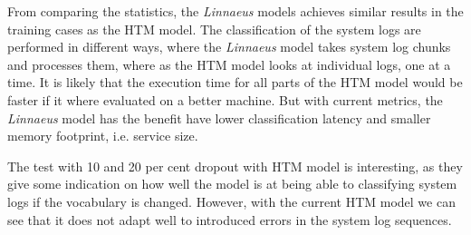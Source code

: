 From comparing the statistics, the \textit{Linnaeus} models achieves similar results in the training cases as the HTM model. The classification of the system logs are performed in different ways, where the \textit{Linnaeus} model takes system log chunks and processes them, where as the HTM model looks at individual logs, one at a time. It is likely that the execution time for all parts of the HTM model would be faster if it where evaluated on a better machine. But with current metrics, the \textit{Linnaeus} model has the benefit have lower classification latency and smaller memory footprint, i.e. service size.

The test with 10 and 20 per cent dropout with HTM model is interesting, as they give some indication on how well the model is at being able to classifying system logs if the vocabulary is changed. However, with the current HTM model we can see that it does not adapt well to introduced errors in the system log sequences. 



